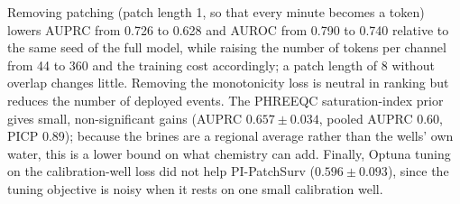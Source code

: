 Removing patching (patch length 1, so that every minute becomes a token) lowers AUPRC from 0.726 to 0.628
and AUROC from 0.790 to 0.740 relative to the same seed of the full model, while raising the number of
tokens per channel from 44 to 360 and the training cost accordingly; a patch length of 8 without overlap
changes little. Removing the monotonicity loss is neutral in ranking but reduces the number of deployed
events. The PHREEQC saturation-index prior gives small, non-significant gains (AUPRC $0.657\pm0.034$, pooled
AUPRC 0.60, PICP 0.89); because the brines are a regional average rather than the wells' own water, this is
a lower bound on what chemistry can add. Finally, Optuna tuning on the calibration-well loss did not help
PI-PatchSurv ($0.596\pm0.093$), since the tuning objective is noisy when it rests on one small calibration
well.
